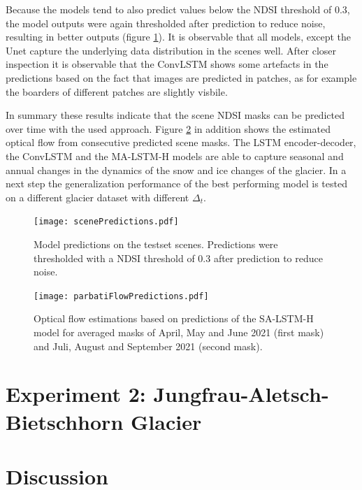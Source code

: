 \documentclass[12pt]{article}
\begin{document}
Because the models tend to also predict values below the NDSI threshold of 0.3, the model outputs were again thresholded after prediction to reduce noise, resulting in better outputs (figure \ref{fig:figure6}). It is observable that all models, except the Unet capture the underlying data distribution in the scenes well. After closer inspection it is observable that the ConvLSTM shows some artefacts in the predictions based on the fact that images are predicted in patches, as for example the boarders of different patches are slightly visbile.

In summary these results indicate that the scene NDSI masks can be predicted over time with the used approach. Figure \ref{fig:figure7} in addition shows the estimated optical flow from consecutive predicted scene masks. The LSTM encoder-decoder, the ConvLSTM and the MA-LSTM-H models are able to capture seasonal and annual changes in the dynamics of the snow and ice changes of the glacier. In a next step the generalization performance of the best performing model is tested on a different glacier dataset with different $\Delta_t$.    

\begin{figure}[H]
	
	\centering
	\texttt{[image: scenePredictions.pdf]}\hfill
	
	\caption{Model predictions on the testset scenes. Predictions were thresholded with a NDSI threshold of 0.3 after prediction to reduce noise.}
	\label{fig:figure6}
	
\end{figure} 

\begin{figure}[H]
	
	\centering
	\texttt{[image: parbatiFlowPredictions.pdf]}\hfill
	
	\caption{Optical flow estimations based on predictions of the SA-LSTM-H model for averaged masks of April, May and June 2021 (first mask) and Juli, August and September 2021 (second mask).}
	\label{fig:figure7}
	
\end{figure} 


\section{Experiment 2: Jungfrau-Aletsch-Bietschhorn Glacier}

\section{Discussion}
\end{document}
